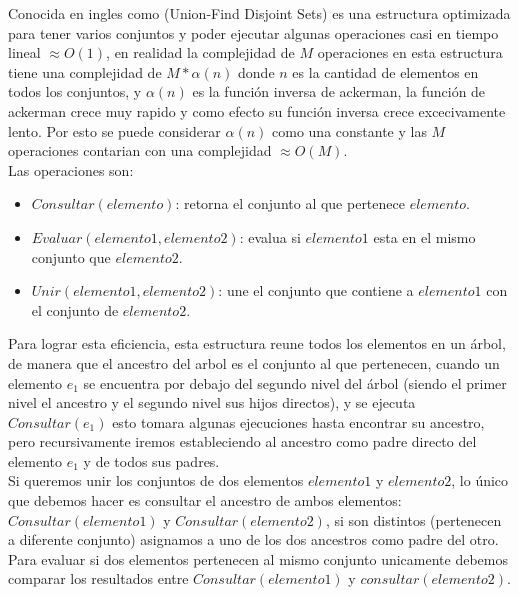 Conocida en ingles como (Union-Find Disjoint Sets) es una estructura optimizada para tener varios conjuntos y poder 	ejecutar algunas operaciones casi en tiempo lineal $\approx O(1)$, en realidad la complejidad de $M$ operaciones en esta estructura tiene una complejidad de $M*\alpha(n)$ donde $n$ es la cantidad de elementos en todos los conjuntos, y $\alpha(n)$ es la función inversa de ackerman, la función de ackerman crece muy rapido y como efecto su función inversa crece excecivamente lento. Por esto se puede considerar $\alpha(n)$ como una constante y las $M$ operaciones contarian con una complejidad $\approx O(M)$.
\\Las operaciones son:
\\\begin{itemize}
\item $Consultar(elemento)$: retorna el conjunto al que pertenece $elemento$.
\item $Evaluar(elemento1,elemento2)$: evalua si $elemento1$ esta en el mismo conjunto que $elemento2$.
\item $Unir(elemento1,elemento2)$: une el conjunto que contiene a $elemento1$ con el conjunto de $elemento2$.
\end{itemize}
Para lograr esta eficiencia, esta estructura reune todos los elementos en un árbol, de manera que el ancestro del arbol es el conjunto al que pertenecen, cuando un elemento $e_1$ se encuentra por debajo del segundo nivel del árbol (siendo el primer nivel el ancestro y el segundo nivel sus hijos directos), y se ejecuta $Consultar(e_1)$ esto tomara algunas ejecuciones hasta encontrar su ancestro, pero recursivamente iremos estableciendo al ancestro como padre directo del elemento $e_1$ y de todos sus padres.
\\
Si queremos unir los conjuntos de dos elementos $elemento1$ y $elemento2$, lo único que debemos hacer es consultar el ancestro de ambos elementos: $Consultar(elemento1)$ y $Consultar(elemento2)$, si son distintos (pertenecen a diferente conjunto) asignamos a uno de los dos ancestros como padre del otro.
\\
Para evaluar si dos elementos pertenecen al mismo conjunto unicamente debemos comparar los resultados entre $Consultar(elemento1)$ y $consultar(elemento2)$.
